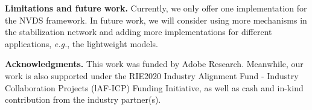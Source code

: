 \documentclass[10pt,twocolumn,letterpaper]{article}
\def\sx{NVDS}
\def\sbn{stabilization network}
\begin{document}
\noindent \textbf{Limitations and future work.} 
Currently, we only offer one implementation for the \sx{} framework. In future work, we will consider using more mechanisms in the \sbn{} and adding more implementations for different applications, \textit{e.g.}, the lightweight models.

\noindent \textbf{Acknowledgments.}
This work was funded by Adobe Research. Meanwhile, our work is also supported under the RIE2020 Industry Alignment Fund - Industry Collaboration Projects (lAF-ICP) Funding Initiative, as well as cash and in-kind contribution from the industry partner(s).






\newpage

{\small


}

\newpage
\end{document}
